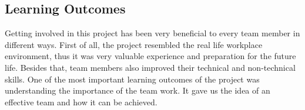\subsection{Learning Outcomes}
Getting involved in this project has been very beneficial to every team member in different ways. First of all, the project resembled the real life workplace environment, thus it was very valuable experience and preparation for the future life. Besides that, team members also improved their technical and non-technical skills. One of the most important learning outcomes of the project was understanding the importance of the team work. It gave us the idea of an effective team and how it can be achieved.



